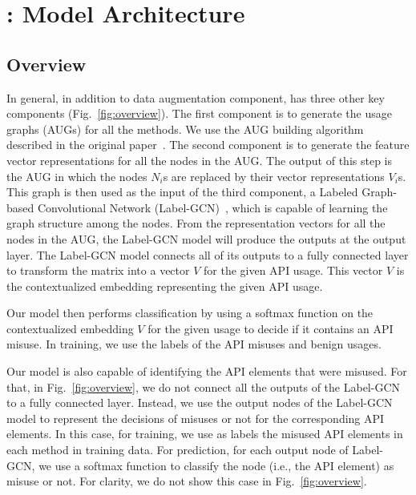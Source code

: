 \section{{\tool}: Model Architecture}
\label{sec:overview}



\subsection{Overview}

In general, in addition to data augmentation component, {\tool} has
three other key components (Fig.~\ref{fig:overview}). The first component is
to generate the usage graphs (AUGs) for all the methods. We use the
AUG building algorithm described in the original
paper~\cite{msr19}. The second component is to generate the feature
vector representations for all the nodes in the AUG. The output of
this step is the AUG in which the nodes $N_i$s are replaced by their
vector representations $V_i$s. This graph is then used as the input of
the third component, a Labeled Graph-based Convolutional Network
(Label-GCN)~\cite{label-gcn}, which is capable of learning the graph
structure among the nodes. From the representation vectors for all the
nodes in the AUG, the Label-GCN model will produce the outputs at the
output layer. The Label-GCN model connects all of its outputs to a
fully connected layer to transform the matrix into a vector $V$ for
the given API usage. This vector $V$ is the contextualized embedding
representing the given API usage.

Our model then performs classification by using a softmax function on
the contextualized embedding $V$ for the given usage to decide if it
contains an API misuse. In training, we use the labels of the API
misuses and benign usages.

Our model is also capable of identifying the API elements that were
misused. For that, in Fig.~\ref{fig:overview}, we do not connect all
the outputs of the Label-GCN to a fully connected layer. Instead, we
use the output nodes of the Label-GCN model to represent the decisions
of misuses or not for the corresponding API elements. In this case,
for training, we use as labels the misused API elements in each method
in training data. For prediction, for each output node of Label-GCN,
we use a softmax function to classify the node (i.e., the API element)
as misuse or not. For clarity, we do not show this case in
Fig.~\ref{fig:overview}.


